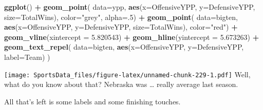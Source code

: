 \documentclass[
]{book}
\newenvironment{Shaded}{\begin{snugshade}}{\end{snugshade}}
\newcommand{\DataTypeTok}[1]{\textcolor[rgb]{0.13,0.29,0.53}{#1}}
\newcommand{\DecValTok}[1]{\textcolor[rgb]{0.00,0.00,0.81}{#1}}
\newcommand{\FloatTok}[1]{\textcolor[rgb]{0.00,0.00,0.81}{#1}}
\newcommand{\KeywordTok}[1]{\textcolor[rgb]{0.13,0.29,0.53}{\textbf{#1}}}
\newcommand{\NormalTok}[1]{#1}
\newcommand{\OperatorTok}[1]{\textcolor[rgb]{0.81,0.36,0.00}{\textbf{#1}}}
\newcommand{\StringTok}[1]{\textcolor[rgb]{0.31,0.60,0.02}{#1}}
\begin{document}
\begin{Shaded}
\begin{Highlighting}[]
\KeywordTok{ggplot}\NormalTok{() }\OperatorTok{+}\StringTok{ }
\StringTok{  }\KeywordTok{geom_point}\NormalTok{(}
    \DataTypeTok{data=}\NormalTok{ypp, }
    \KeywordTok{aes}\NormalTok{(}\DataTypeTok{x=}\NormalTok{OffensiveYPP, }\DataTypeTok{y=}\NormalTok{DefensiveYPP, }\DataTypeTok{size=}\NormalTok{TotalWins), }
    \DataTypeTok{color=}\StringTok{"grey"}\NormalTok{, }
    \DataTypeTok{alpha=}\NormalTok{.}\DecValTok{5}\NormalTok{) }\OperatorTok{+}\StringTok{ }
\StringTok{  }\KeywordTok{geom_point}\NormalTok{(}
    \DataTypeTok{data=}\NormalTok{bigten, }
    \KeywordTok{aes}\NormalTok{(}\DataTypeTok{x=}\NormalTok{OffensiveYPP, }\DataTypeTok{y=}\NormalTok{DefensiveYPP, }\DataTypeTok{size=}\NormalTok{TotalWins), }
    \DataTypeTok{color=}\StringTok{"red"}\NormalTok{) }\OperatorTok{+}\StringTok{ }
\StringTok{  }\KeywordTok{geom_vline}\NormalTok{(}\DataTypeTok{xintercept =} \FloatTok{5.820543}\NormalTok{) }\OperatorTok{+}\StringTok{ }
\StringTok{  }\KeywordTok{geom_hline}\NormalTok{(}\DataTypeTok{yintercept =} \FloatTok{5.673263}\NormalTok{) }\OperatorTok{+}\StringTok{ }
\StringTok{  }\KeywordTok{geom_text_repel}\NormalTok{(}
    \DataTypeTok{data=}\NormalTok{bigten, }
    \KeywordTok{aes}\NormalTok{(}\DataTypeTok{x=}\NormalTok{OffensiveYPP, }\DataTypeTok{y=}\NormalTok{DefensiveYPP, }\DataTypeTok{label=}\NormalTok{Team)}
\NormalTok{  )}
\end{Highlighting}
\end{Shaded}

\texttt{[image: SportsData\_files/figure-latex/unnamed-chunk-229-1.pdf]}
Well, what do you know about that? Nebraska was \ldots{} really average last season.

All that's left is some labels and some finishing touches.
\end{document}
